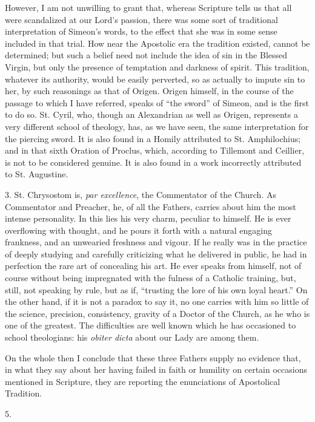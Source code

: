 However, I am not unwilling to grant that, whereas Scripture tells us
that all were scandalized at our Lord's passion, there was some sort of
traditional interpretation of Simeon's words, to the effect that she was
in some sense included in that trial. How near the Apostolic era the
tradition existed, cannot be determined; but such a belief need not
include the idea of sin in the Blessed Virgin, but only the presence of
temptation and darkness of spirit. This tradition, whatever its
authority, would be easily perverted, so as actually to impute sin to
her, by such reasonings as that of Origen. Origen himself, in the course
of the passage to which I have referred, speaks of ``the sword''
of Simeon, and is the first to do so. St. Cyril, who, though an
Alexandrian as well as Origen, represents a very different school of
theology, has, as we have seen, the same interpretation for the piercing
sword. It is also found in a Homily attributed to St. Amphilochius; and
in that sixth Oration of Proclus, which, according to Tillemont and
Ceillier, is not to be considered genuine. It is also found in a work
incorrectly attributed to St. Augustine.


3. St. Chrysostom is, \emph{par excellence}, the Commentator of
the Church. As Commentator and Preacher, he, of all the Fathers, carries
about him the most intense personality. In this lies his very charm,
peculiar to himself. He is ever overflowing with thought, and he pours
it forth with a natural engaging frankness, and an unwearied freshness
and vigour. If he really was in the practice of deeply studying and
carefully criticizing what he delivered in public, he had in perfection
the rare art of concealing his art. He ever speaks from himself, not of
course without being impregnated with the fulness of a Catholic
training, but, still, not speaking by rule, but as if, ``trusting
the lore of his own loyal heart.'' On the other hand, if it is not a
paradox to say it, no one carries with him so little of the science,
precision, consistency, gravity of a Doctor of the Church, as he who is
one of the greatest. The difficulties are well known which he has
occasioned to school theologians: his \emph{obiter dicta} about our Lady
are among them.


On the whole then I conclude that these three Fathers supply no
evidence that, in what they say about her having failed in faith or
humility on certain occasions mentioned in Scripture, they are reporting
the enunciations of Apostolical Tradition.


5.


